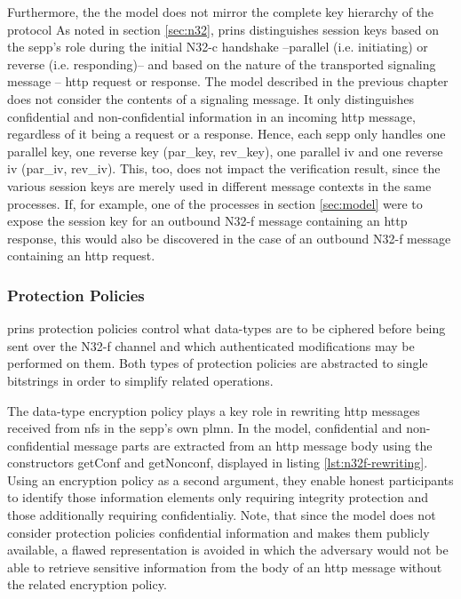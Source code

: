 Furthermore, the the model does not mirror the complete key hierarchy of the protocol
As noted in section \ref{sec:n32}, \gls{prins} distinguishes session keys based on the \gls{sepp}'s role during the initial N32-c handshake --parallel (i.e. initiating) or reverse (i.e. responding)-- and based on the nature of the transported signaling message -- \gls{http} request or response.
The model described in the previous chapter does not consider the contents of a signaling message.
It only distinguishes confidential and non-confidential information in an incoming \gls{http} message, regardless of it being a request or a response.
Hence, each \gls{sepp} only handles one parallel key, one reverse key ({\sffamily par\_key}, {\sffamily rev\_key}), one parallel \gls{iv} and one reverse \gls{iv} ({\sffamily par\_iv}, {\sffamily rev\_iv}).
This, too, does not impact the verification result, since the various session keys are merely used in different message contexts in the same processes.
If, for example, one of the processes in section \ref{sec:model} were to expose the session key for an outbound N32-f message containing an \gls{http} response, this would also be discovered in the case of an outbound N32-f message containing an \gls{http} request.

\subsubsection{Protection Policies}

\gls{prins} protection policies control what data-types are to be ciphered before being sent over the N32-f channel and which authenticated modifications may be performed on them.
Both types of protection policies are abstracted to single bitstrings in order to simplify related operations.

The data-type encryption policy plays a key role in rewriting \gls{http} messages received from \glspl{nf} in the \gls{sepp}'s own \gls{plmn}.
In the model, confidential and non-confidential message parts are extracted from an \gls{http} message body using the constructors {\sffamily getConf} and {\sffamily getNonconf}, displayed in listing \ref{lst:n32f-rewriting}.
Using an encryption policy as a second argument, they enable honest participants to identify those information elements only requiring integrity protection and those additionally requiring confidentialiy.
Note, that since the model does not consider protection policies confidential information and makes them publicly available, a flawed representation is avoided in which the adversary would not be able to retrieve sensitive information from the body of an \gls{http} message without the related encryption policy.

